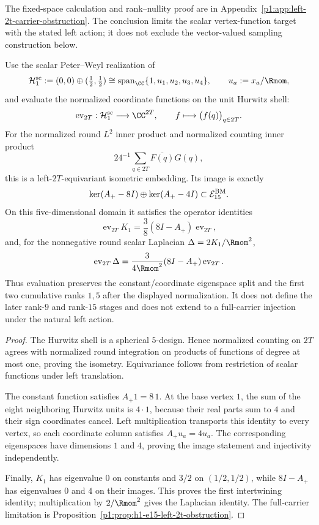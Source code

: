 \documentclass[11pt]{article}
\begin{document}
\noindent
The fixed-space calculation and rank--nullity proof are in
Appendix~\ref{p1:app:left-2t-carrier-obstruction}.  The conclusion limits the
scalar vertex-function target with the stated left action; it does not
exclude the vector-valued sampling construction below.

\begin{proposition}
\label{p1:prop:h1-scalar-hurwitz-evaluation-bridge}
Use the scalar Peter--Weyl realization of
\[
 \mathcal H_1^{\rm sc}
 :=(0,0)\oplus(\tfrac12,\tfrac12)
 \cong\operatorname{span}_{\CC}\{1,u_1,u_2,u_3,u_4\},
 \qquad u_a:=x_a/\Rmom,
\]
and evaluate the normalized coordinate functions on the unit Hurwitz shell:
\[
 \operatorname{ev}_{2T}:\mathcal H_1^{\rm sc}\longrightarrow\CC^{2T},
 \qquad
 f\longmapsto\bigl(f(q)\bigr)_{q\in2T}.
\]
For the normalized round \(L^2\) inner product and normalized counting
inner product
\[
 24^{-1}\sum_{q\in2T}\overline{F(q)}G(q),
\]
this is a left-\(2T\)-equivariant isometric embedding.  Its image is exactly
\[
 \ker(A_+-8I)\oplus\ker(A_+-4I)
 \subset\mathcal E_{15}^{\rm BM}.
\]
On this five-dimensional domain it satisfies the operator identities
\[
 \operatorname{ev}_{2T}K_1
 =\frac38(8I-A_+)\operatorname{ev}_{2T},
\]
and, for the nonnegative round scalar Laplacian
\(\Delta=2K_1/\Rmom^2\),
\[
 \operatorname{ev}_{2T}\Delta
 =\frac{3}{4\Rmom^2}(8I-A_+)\operatorname{ev}_{2T}.
\]
Thus evaluation preserves the constant/coordinate eigenspace split and the
first two cumulative ranks \(1,5\) after the displayed normalization.  It does
not define the later rank-\(9\) and rank-\(15\) stages and does not extend to a
full-carrier injection under the natural left action.
\end{proposition}

\begin{proof}
The Hurwitz shell is a spherical \(5\)-design.  Hence normalized counting on
\(2T\) agrees with normalized round integration on products of functions of
degree at most one, proving the isometry.  Equivariance follows from
restriction of scalar functions under left translation.

The constant function satisfies \(A_+1=8\,1\).  At the base vertex \(1\), the
sum of the eight neighboring Hurwitz units is \(4\cdot1\), because their real
parts sum to \(4\) and their sign coordinates cancel.  Left multiplication
transports this identity to every vertex, so each coordinate column satisfies
\(A_+u_a=4u_a\).  The corresponding eigenspaces have dimensions \(1\) and
\(4\), proving the image statement and injectivity independently.

Finally, \(K_1\) has eigenvalue \(0\) on constants and \(3/2\) on
\((1/2,1/2)\), while \(8I-A_+\) has eigenvalues \(0\) and \(4\) on their
images.  This proves the first intertwining identity; multiplication by
\(2/\Rmom^2\) gives the Laplacian identity.  The full-carrier limitation is
Proposition~\ref{p1:prop:h1-e15-left-2t-obstruction}.
\end{proof}
\end{document}
